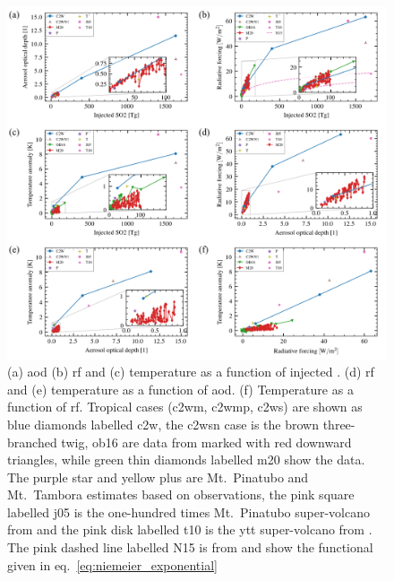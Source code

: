 \documentclass{ametsocV6.1}
\newcommand{\iso}[1][i]{{#1}njected \ce{SO2}}
\begin{document}
\begin{figure}
  \centering
  \includegraphics{figures/figure4.png}

  \caption{(a) \gls{aod} (b) \gls{rf} and (c) temperature as a function of \iso{}\@. (d)
    \gls{rf} and (e) temperature as a function of \gls{aod}. (f) Temperature as a function
    of \gls{rf}. Tropical cases (\gls{c2wm}, \gls{c2wmp}, \gls{c2ws}) are shown as blue
    diamonds labelled \gls{c2w}, the \gls{c2wsn} case is the brown three-branched twig,
    \gls{ob16} are data from \citet{ottobliesner2016} marked with red downward triangles,
    while green thin diamonds labelled \gls{m20} show the \citet{marshall2020dataset} data.
    The purple star and yellow plus are Mt.\ Pinatubo and Mt.\ Tambora estimates based on
    observations, the pink square labelled \gls{j05} is the one-hundred times Mt.\ Pinatubo
    super-volcano from \citet{jones2005} and the pink disk labelled \gls{t10} is the
    \gls{ytt} super-volcano from \citet{timmreck2010}. The pink dashed line labelled N15 is
    from \citet{niemeier2015} and show the functional given in
    eq.~\ref{eq:niemeier_exponential}}\label{fig:parameter_scan}%
\end{figure}
\end{document}
